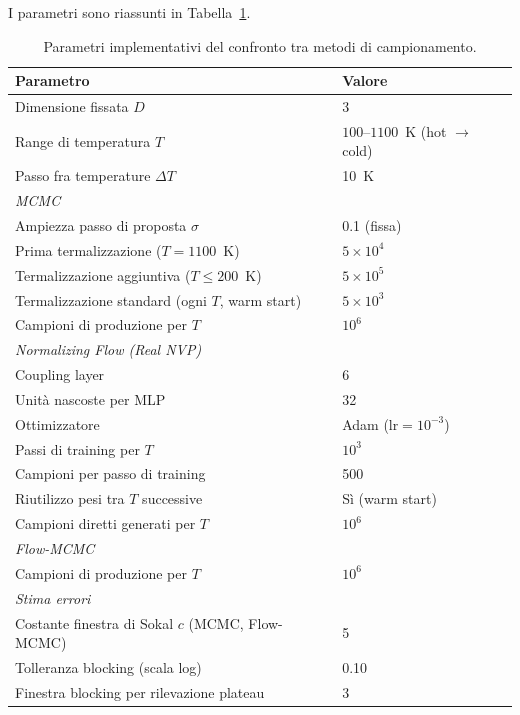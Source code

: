 I parametri sono riassunti in Tabella~\ref{tab:confronto_details}.
\begin{table}[H]
\centering
\begin{tabular}{ll}
\toprule
Parametro & Valore \\
\midrule
Dimensione fissata $D$                                    & 3 \\
Range di temperatura $T$                                    & $100$--$1100$~K (hot $\to$ cold) \\
Passo fra temperature $\Delta T$                             & 10~K \\
\midrule
\multicolumn{2}{l}{\emph{MCMC}} \\
Ampiezza passo di proposta $\sigma$                          & 0.1 (fissa) \\
Prima termalizzazione ($T=1100$~K)                                & $5\times10^4$ \\
Termalizzazione aggiuntiva ($T\le200$~K)                     & $5\times10^5$ \\
Termalizzazione standard (ogni $T$, warm start)                & $5\times10^3$ \\
Campioni di produzione per $T$                                 & $10^6$ \\
\midrule
\multicolumn{2}{l}{\emph{Normalizing Flow (Real NVP)}} \\
Coupling layer                                               & 6 \\
Unità nascoste per MLP                                        & 32 \\
Ottimizzatore                                                  & Adam ($\text{lr}=10^{-3}$) \\
Passi di training per $T$                                      & $10^3$ \\
Campioni per passo di training                                 & 500 \\
Riutilizzo pesi tra $T$ successive                             & Sì (warm start) \\
Campioni diretti generati per $T$                               & $10^6$ \\
\midrule
\multicolumn{2}{l}{\emph{Flow-MCMC}} \\
Campioni di produzione per $T$                                 & $10^6$ \\
\midrule
\multicolumn{2}{l}{\emph{Stima errori}} \\
Costante finestra di Sokal $c$ (MCMC, Flow-MCMC)                & 5 \\
Tolleranza blocking (scala log)                                & 0.10 \\
Finestra blocking per rilevazione plateau                       & 3 \\
\bottomrule
\end{tabular}
\caption{Parametri implementativi del confronto tra metodi di campionamento.}
\label{tab:confronto_details}
\end{table}
\FloatBarrier
